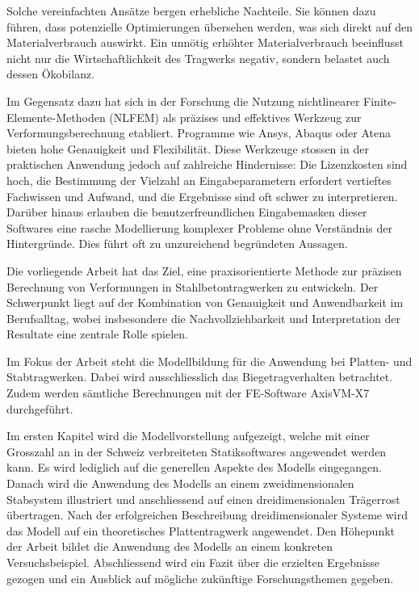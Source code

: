 \documentclass[
  11pt,
  letterpaper,
]{scrreprt}
\begin{document}
Solche vereinfachten Ansätze bergen erhebliche Nachteile. Sie können
dazu führen, dass potenzielle Optimierungen übersehen werden, was sich
direkt auf den Materialverbrauch auswirkt. Ein unnötig erhöhter
Materialverbrauch beeinflusst nicht nur die Wirtschaftlichkeit des
Tragwerks negativ, sondern belastet auch dessen Ökobilanz.

Im Gegensatz dazu hat sich in der Forschung die Nutzung nichtlinearer
Finite-Elemente-Methoden (NLFEM) als präzises und effektives Werkzeug
zur Verformungsberechnung etabliert. Programme wie Ansys, Abaqus oder
Atena bieten hohe Genauigkeit und Flexibilität. Diese Werkzeuge stossen
in der praktischen Anwendung jedoch auf zahlreiche Hindernisse: Die
Lizenzkosten sind hoch, die Bestimmung der Vielzahl an Eingabeparametern
erfordert vertieftes Fachwissen und Aufwand, und die Ergebnisse sind oft
schwer zu interpretieren. Darüber hinaus erlauben die
benutzerfreundlichen Eingabemasken dieser Softwares eine rasche
Modellierung komplexer Probleme ohne Verständnis der Hintergründe. Dies
führt oft zu unzureichend begründeten Aussagen.

Die vorliegende Arbeit hat das Ziel, eine praxisorientierte Methode zur
präzisen Berechnung von Verformungen in Stahlbetontragwerken zu
entwickeln. Der Schwerpunkt liegt auf der Kombination von Genauigkeit
und Anwendbarkeit im Berufsalltag, wobei insbesondere die
Nachvollziehbarkeit und Interpretation der Resultate eine zentrale Rolle
spielen.

Im Fokus der Arbeit steht die Modellbildung für die Anwendung bei
Platten- und Stabtragwerken. Dabei wird ausschliesslich das
Biegetragverhalten betrachtet. Zudem werden sämtliche Berechnungen mit
der FE-Software AxisVM-X7 durchgeführt.

Im ersten Kapitel wird die Modellvorstellung aufgezeigt, welche mit
einer Grosszahl an in der Schweiz verbreiteten Statiksoftwares
angewendet werden kann. Es wird lediglich auf die generellen Aspekte des
Modells eingegangen. Danach wird die Anwendung des Modells an einem
zweidimensionalen Stabsystem illustriert und anschliessend auf einen
dreidimensionalen Trägerrost übertragen. Nach der erfolgreichen
Beschreibung dreidimensionaler Systeme wird das Modell auf ein
theoretisches Plattentragwerk angewendet. Den Höhepunkt der Arbeit
bildet die Anwendung des Modells an einem konkreten Versuchsbeispiel.
Abschliessend wird ein Fazit über die erzielten Ergebnisse gezogen und
ein Ausblick auf mögliche zukünftige Forschungsthemen gegeben.

\end{document}
